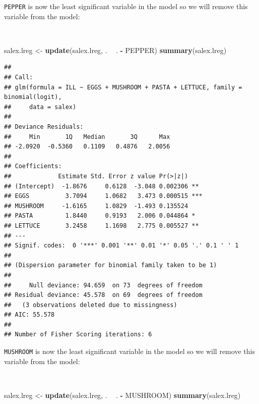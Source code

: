 \documentclass[12pt,a4paper]{book}
\newenvironment{Shaded}{\begin{snugshade}}{\end{snugshade}}
\newcommand{\KeywordTok}[1]{\textcolor[rgb]{0.13,0.29,0.53}{\textbf{#1}}}
\newcommand{\NormalTok}[1]{#1}
\newcommand{\OperatorTok}[1]{\textcolor[rgb]{0.81,0.36,0.00}{\textbf{#1}}}
\newcommand{\StringTok}[1]{\textcolor[rgb]{0.31,0.60,0.02}{#1}}
\theoremstyle{definition}
\theoremstyle{definition}
\theoremstyle{definition}
\theoremstyle{remark}
\begin{document}
\newpage

\texttt{PEPPER} is now the least significant variable in the model so we
will remove this variable from the model:

~

\begin{Shaded}
\begin{Highlighting}[]
\NormalTok{salex.lreg <-}\StringTok{ }\KeywordTok{update}\NormalTok{(salex.lreg, . }\OperatorTok{~}\StringTok{ }\NormalTok{. }\OperatorTok{-}\StringTok{ }\NormalTok{PEPPER)}
\KeywordTok{summary}\NormalTok{(salex.lreg)}
\end{Highlighting}
\end{Shaded}

\begin{verbatim}
## 
## Call:
## glm(formula = ILL ~ EGGS + MUSHROOM + PASTA + LETTUCE, family = binomial(logit), 
##     data = salex)
## 
## Deviance Residuals: 
##     Min       1Q   Median       3Q      Max  
## -2.0920  -0.5360   0.1109   0.4876   2.0056  
## 
## Coefficients:
##             Estimate Std. Error z value Pr(>|z|)    
## (Intercept)  -1.8676     0.6128  -3.048 0.002306 ** 
## EGGS          3.7094     1.0682   3.473 0.000515 ***
## MUSHROOM     -1.6165     1.0829  -1.493 0.135524    
## PASTA         1.8440     0.9193   2.006 0.044864 *  
## LETTUCE       3.2458     1.1698   2.775 0.005527 ** 
## ---
## Signif. codes:  0 '***' 0.001 '**' 0.01 '*' 0.05 '.' 0.1 ' ' 1
## 
## (Dispersion parameter for binomial family taken to be 1)
## 
##     Null deviance: 94.659  on 73  degrees of freedom
## Residual deviance: 45.578  on 69  degrees of freedom
##   (3 observations deleted due to missingness)
## AIC: 55.578
## 
## Number of Fisher Scoring iterations: 6
\end{verbatim}

\newpage

\texttt{MUSHROOM} is now the least significant variable in the model so
we will remove this variable from the model:

~

\begin{Shaded}
\begin{Highlighting}[]
\NormalTok{salex.lreg <-}\StringTok{ }\KeywordTok{update}\NormalTok{(salex.lreg, . }\OperatorTok{~}\StringTok{ }\NormalTok{. }\OperatorTok{-}\StringTok{ }\NormalTok{MUSHROOM)}
\KeywordTok{summary}\NormalTok{(salex.lreg)}
\end{Highlighting}
\end{Shaded}
\end{document}
